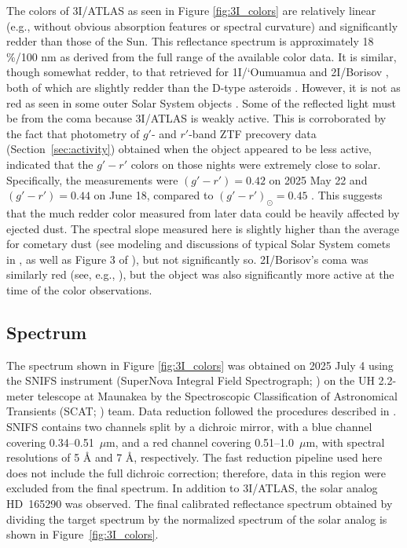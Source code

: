 \documentclass[linenumbers,twocolumn,longbib]{aastex7}
\begin{document}
The colors of 3I/ATLAS as seen in Figure \ref{fig:3I_colors} are relatively linear (e.g., without obvious absorption features or spectral curvature) and significantly redder than those of the Sun. This reflectance spectrum is approximately 18  \%/100 nm as derived from the full range of the available color data. It is similar, though somewhat redder, to that retrieved for 1I/`Oumuamua \citep[10$\pm$6  \%/100 nm,][]{Ye2017} and 2I/Borisov  \citep[12$\pm$1  \%/100 nm][]{deleon2020}, both of which are slightly redder than the D-type asteroids \citep{DeMeo2009}. However, it is not as red as seen in some outer Solar System objects  \citep[e.g. Pholus,][]{Binzel1992}. Some of the reflected light must be from the coma because 3I/ATLAS is weakly active. This is corroborated by the fact that photometry of $g'$- and $r'$-band ZTF precovery data (Section~\ref{sec:activity}) obtained when the object appeared to be less active, indicated that the $g'-r'$ colors on those nights were extremely close to solar. Specifically, the measurements were $(g'-r')=0.42$ on 2025 May 22 and $(g'-r')=0.44$ on June 18, compared to $(g'-r')_{\odot}=0.45$ \citep{holmberg2006_solarcolors}. This suggests that the much redder color measured from later data could be heavily affected by ejected dust. The spectral slope measured here is slightly higher than the average for cometary dust (see modeling and discussions of typical Solar System comets in \citealt{protopapa2018, kareta_noonan23}, as well as Figure 3 of \citealt{2024come.book..621K}), but not significantly so. 2I/Borisov's coma was similarly red (see, e.g., \citealt{deleon2020}), but the object was also significantly more active at the time of the color observations.

\subsection{Spectrum}\label{sec:spectrum}

The spectrum shown in Figure \ref{fig:3I_colors} was obtained on 2025 July 4 using the SNIFS instrument (SuperNova Integral Field Spectrograph; \citealp{Lantz2004}) on the UH 2.2-meter telescope at Maunakea by the Spectroscopic Classification of Astronomical Transients (SCAT; \citealp{Tucker2022}) team. Data reduction followed the procedures described in \citet{Tucker2022}. SNIFS contains two channels split by a dichroic mirror, with a blue channel covering 0.34--0.51~$\mu$m, and a red channel covering 0.51--1.0~$\mu$m, with spectral resolutions of 5 \r{A} and 7 \r{A}, respectively. The fast reduction pipeline used here does not include the full dichroic correction; therefore, data in this region were excluded from the final spectrum. In addition to 3I/ATLAS, the solar analog HD~165290 was observed. The final calibrated reflectance spectrum obtained by dividing the target spectrum by the normalized spectrum of the solar analog is shown in Figure~\ref{fig:3I_colors}.
\end{document}
